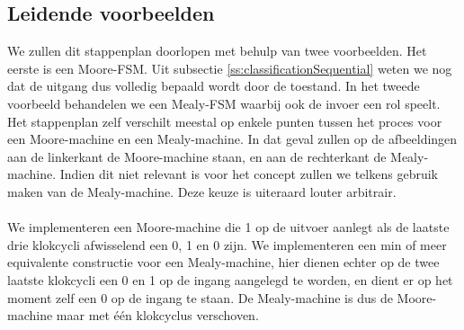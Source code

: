 \subsection{Leidende voorbeelden}
We zullen dit stappenplan doorlopen met behulp van twee voorbeelden. Het eerste is een Moore-FSM. Uit subsectie \ref{ss:classificationSequential} weten we nog dat de uitgang dus volledig bepaald wordt door de toestand. In het tweede voorbeeld behandelen we een Mealy-FSM waarbij ook de invoer een rol speelt. Het stappenplan zelf verschilt meestal op enkele punten tussen het proces voor een Moore-machine en een Mealy-machine. In dat geval zullen op de afbeeldingen aan de linkerkant de Moore-machine staan, en aan de rechterkant de Mealy-machine. Indien dit niet relevant is voor het concept zullen we telkens gebruik maken van de Mealy-machine. Deze keuze is uiteraard louter arbitrair.
\paragraph{}
We implementeren een Moore-machine die 1 op de uitvoer aanlegt als de laatste drie klokcycli afwisselend een 0, 1 en 0 zijn. We implementeren een min of meer equivalente constructie voor een Mealy-machine, hier dienen echter op de twee laatste klokcycli een 0 en 1 op de ingang aangelegd te worden, en dient er op het moment zelf een 0 op de ingang te staan. De Mealy-machine is dus de Moore-machine maar met \'e\'en klokcyclus verschoven.

